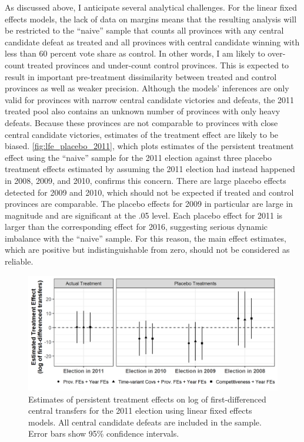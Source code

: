 \documentclass[12pt]{article}
\newcommand{\1}{\mathbbm{1}}
\begin{document}
As discussed above, I anticipate several analytical challenges. For the linear fixed effects models, the lack of data on margins means that the resulting analysis will be restricted to the ``naive'' sample that counts all provinces with any central candidate defeat as treated and all provinces with central candidate winning with less than 60 percent vote share as control. In other words, I am likely to over-count treated provinces and under-count control provinces. This is expected to result in important pre-treatment dissimilarity between treated and control provinces as well as weaker precision. Although the models' inferences are only valid for provinces with narrow central candidate victories and defeats, the 2011 treated pool also contains an unknown number of provinces with only heavy defeats. Because these provinces are not comparable to provinces with close central candidate victories, estimates of the treatment effect are likely to be biased. \autoref{fig:lfe_placebo_2011}, which plots estimates of the persistent treatment effect using the ``naive'' sample for the 2011 election against three placebo treatment effects estimated by assuming the 2011 election had instead happened in 2008, 2009, and 2010, confirms this concern. There are large placebo effects detected for 2009 and 2010, which should not be expected if treated and control provinces are comparable. The placebo effects for 2009 in particular are large in magnitude and are significant at the .05 level. Each placebo effect for 2011 is larger than the corresponding effect for 2016, suggesting serious dynamic imbalance with the ``naive'' sample. For this reason, the main effect estimates, which are positive but indistinguishable from zero, should not be considered as reliable.

\begin{figure}[!htbp]
	\centering
	\includegraphics[]{figure/210202_lfe_placebo_2011.png}
	\captionsetup{singlelinecheck=off}
	\caption[Estimated placebo linear fixed effects treatment effects for 2011]{Estimates of persistent treatment effects on log of first-differenced central transfers for the 2011 election using linear fixed effects models. All central candidate defeats are included in the sample. Error bars show 95\% confidence intervals.}
	\label{fig:lfe_placebo_2011}
\end{figure}
\end{document}
